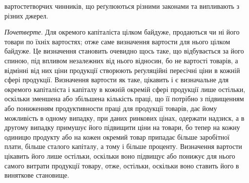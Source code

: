 \parcont{}  %
вартостетворчих чинників, що реґулюються різними законами та випливають
з різних джерел.

\emph{Почетверте}. Для окремого капіталіста цілком байдуже, продаються чи
ні його товари по їхніх вартостях; отже саме визначення вартости для нього
цілком байдуже. Це визначення становить очевидно щось таке, що відбувається
за його спиною, під впливом незалежних від нього відносин, бо не вартості
товарів, а відмінні від них ціни продукції створюють реґуляційні пересічні
ціни в кожній сфері продукції. Визначення вартости як таке, цікавить і є визначальне
для окремого капіталіста і капіталу в кожній окремій сфері продукції лише
остільки, оскільки зменшена або збільшена кількість праці, що її потрібно з підвищенням
або пониженням продуктивности праці для продукції товарів, дає йому можливість
в одному випадку, при даних ринкових цінах, одержати надзиск, а в другому
випадку примушує його підвищити ціни на товари, бо тепер на кожну одиницю
продукту або на кожен окремий товар припадає більше заробітної плати, більше
сталого капіталу, а тому і більше проценту. Визначення вартости цікавить
його лише остільки, оскільки воно підвищує або понижує для нього самого
витрати продукції товару, отже, остільки, оскільки воно ставить його в виняткове
становище.

